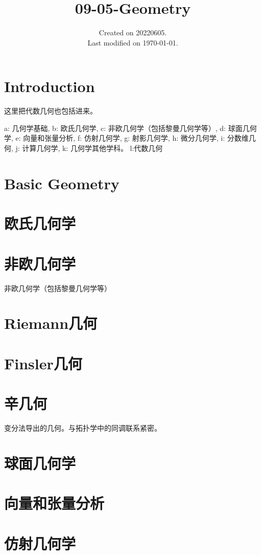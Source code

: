 \documentclass[UTF8]{../09-Mathematics}
\begin{document}
\title{09-05-Geometry}
\date{Created on 20220605.\\   Last modified on \today.}
\maketitle
\tableofcontents


\chapter{Introduction}
这里把代数几何也包括进来。

a: 几何学基础, 
b: 欧氏几何学, 
c: 非欧几何学（包括黎曼几何学等）, 
d: 球面几何学, 
e: 向量和张量分析, 
f: 仿射几何学, 
g: 射影几何学, 
h: 微分几何学, 
i: 分数维几何, 
j: 计算几何学, 
k: 几何学其他学科。
l:代数几何

\chapter{Basic Geometry}

\chapter{欧氏几何学}
\chapter{非欧几何学}
非欧几何学（包括黎曼几何学等）


\chapter{Riemann几何}
\chapter{Finsler几何}

\chapter{辛几何}
变分法导出的几何。与拓扑学中的同调联系紧密。


\chapter{球面几何学}


\chapter{向量和张量分析}
\chapter{仿射几何学}
\end{document}
